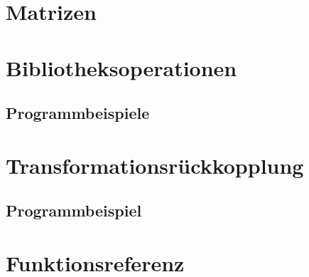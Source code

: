 \section{Matrizen}

\section{Bibliotheksoperationen}

\subsection{Programmbeispiele}

\section{Transformationsrückkopplung}
\subsection{Programmbeispiel}

\section{Funktionsreferenz}




